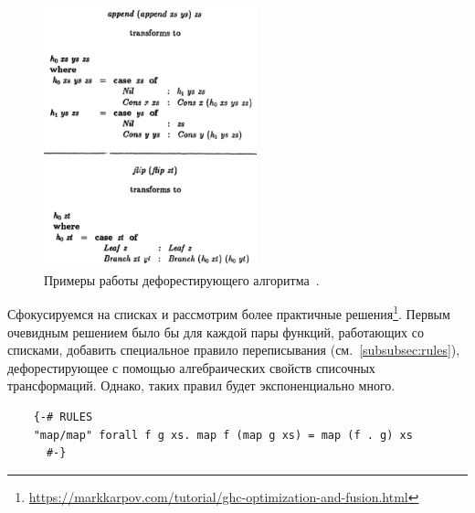 \begin{figure}
    \centering
    \includegraphics[width=0.55\textwidth]{figs/deforestation-examples}
    \caption{Примеры работы дефорестирующего алгоритма~\cite{wadler1988deforestation}.}
    \label{fig:deforestation-examples}
\end{figure}

Сфокусируемся на списках и рассмотрим более практичные решения\footnote{\url{https://markkarpov.com/tutorial/ghc-optimization-and-fusion.html}}.
Первым очевидным решением было бы для каждой пары функций, работающих со списками, добавить специальное правило переписывания (см.~\ref{subsubsec:rules}), дефорестирующее с помощью алгебраических свойств списочных трансформаций.
Однако, таких правил будет экспоненциально много.
\begin{verbatim}
    {-# RULES
    "map/map" forall f g xs. map f (map g xs) = map (f . g) xs
      #-}
\end{verbatim}

